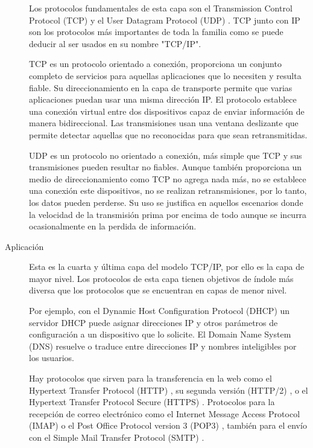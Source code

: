 \begin{description}
  Los protocolos fundamentales de esta capa son el Transmission Control Protocol
  (TCP) \cite{rfc793} y el User Datagram Protocol (UDP) \cite{rfc768}.
  TCP junto con IP son los protocolos más importantes de toda la familia como se
  puede deducir al ser usados en su nombre "TCP/IP".

  TCP es un protocolo orientado a conexión, proporciona un conjunto completo de
  servicios para aquellas aplicaciones que lo necesiten y resulta fiable.
  Su direccionamiento en la capa de transporte permite que varias aplicaciones
  puedan usar una misma dirección IP. El protocolo establece una conexión
  virtual entre dos dispositivos capaz de enviar información de manera
  bidireccional. Las transmisiones usan una ventana deslizante que permite
  detectar aquellas que no reconocidas para que sean retransmitidas.

  UDP es un protocolo no orientado a conexión, más simple que TCP y sus
  transmisiones pueden resultar no fiables. Aunque también proporciona un medio
  de direccionamiento como TCP no agrega nada más, no se establece una
  conexión este dispositivos, no se realizan retransmisiones, por lo tanto, los
  datos pueden perderse. Su uso se justifica en aquellos escenarios donde la
  velocidad de la transmisión prima por encima de todo aunque se incurra
  ocasionalmente en la perdida de información.

  \item[Aplicación] Esta es la cuarta y última capa del modelo TCP/IP, por ello 
  es la capa de mayor nivel. Los protocolos de esta capa tienen objetivos de
  índole más diversa que los protocolos que se encuentran en capas de menor
  nivel.

  Por ejemplo, con el Dynamic Host Configuration Protocol (DHCP) \cite{rfc2131}
  un servidor DHCP puede asignar direcciones IP y otros parámetros de
  configuración a un dispositivo que lo solicite. El Domain Name System (DNS)
  \cite{rfc1034} \cite{rfc1035} resuelve o traduce entre direcciones IP y
  nombres inteligibles por los usuarios.

  Hay protocolos que sirven para la transferencia en la web como el Hypertext
  Transfer Protocol (HTTP) \cite{rfc7230} , su segunda versión (HTTP/2)
  \cite{rfc7540}, o el Hypertext Transfer Protocol Secure (HTTPS) 
  \cite{rfc2818}. Protocolos para la recepción de correo electrónico como el
  Internet Message Access Protocol (IMAP) \cite{rfc3501} o el Post Office
  Protocol version 3 (POP3) \cite{rfc1939}, también para el envío con el
  Simple Mail Transfer Protocol (SMTP) \cite{rfc5321}.


\end{description}
